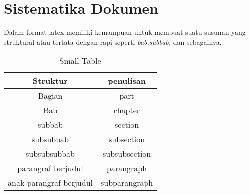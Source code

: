 \section{Sistematika Dokumen}
Dalam format latex memiliki kemampuan untuk membuat suatu susunan yang struktural atau tertata dengan rapi
seperti \textit{bab,subbab,} dan sebagainya.

\begin{table}[h]
\caption{Small Table}
\centering

\begin{tabular}{|c|c|}
\hline
\textbf{Struktur}&\textbf{penulisan}\\
\hline
Bagian&{part}\\
\hline
Bab&{chapter}\\
\hline
subbab&{section}\\
\hline
subsubbab&subsection\\
\hline
subsubsubbab&subsubsection\\
\hline
parangraf berjudul&{parangraph}\\
\hline
anak parangraf berjudul &{subparangraph}\\
\hline
\end{tabular}

\label{table:contoh}
\end{table}